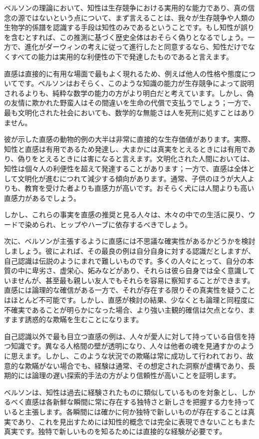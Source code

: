 \documentclass[a4paper,11pt,openany]{ltjsbook}
\begin{document}
ベルソンの理論において、知性は生存競争における実用的な能力であり、真の信念の源ではないという点について、まず言えることは、我々が生存競争や人類の生物学的係譜を認識する手段は知性のみであるということです。もし知性が誤りを含むとすれば、この推測に基づく歴史全体はおそらく偽りとなるでしょう。一方で、進化がダーウィンの考えに従って進行したと同意するなら、知性だけでなくすべての能力は実用的な利便性の下で発達したものであると言えます。

直感は直接的に有用な場面で最もよく現れるため、例えば他人の性格や態度についてです。ベルソンはおそらく、このような知識の能力が生存競争によって説明されるよりも、純粋な数学の能力の方がより明白だと考えています。しかし、偽の友情に欺かれた野蛮人はその間違いを生命の代償で支払うでしょう；一方で、最も文明化された社会においても、数学的な無能さは人を死刑に処すことはありません。

彼が示した直感の動物的例の大半は非常に直接的な生存価値があります。実際、知性と直感は有用であるため発達し、大まかには真実をとえるときには有用であり、偽りをとえるときには害になると言えます。文明化された人間においては、知性は個々人の利便性を超えて発達することがあります；一方で、直感は全体として文明化が進むにつれて減少する傾向があります。通常、子供のほうが大人よりも、教育を受けた者よりも直感力が高いです。おそらく犬には人間よりも高い直感力があるでしょう。

しかし、これらの事実を直感の推奨と見る人々は、木々の中での生活に戻り、ウードで染められ、ヒップやハーブに依存するべきでしょう。

次に、ベルソンが主張するように直感には不思議な確実性があるかどうかを検討しましょう。彼によれば、その最良の例は自分自身に対する認識だとしますが、自己認識は伝説のようにまれで難しいものです。多くの人々にとって、自分の本質の中に卑劣さ、虚栄心、妬みなどがあり、それらは彼ら自身では全く意識していませんが、甚至最も親しい友人でもそれらを容易に察知することができます。直感には論理的な確信がある一方で、それが存在する限りその真実性を疑うことはほとんど不可能です。しかし、直感が検討の結果、少なくとも論理と同程度に不確実であることが明らかになった場合、より強い主観的確信は欠点となり、ますます誘惑的な欺瞞を生むことになります。

自己認識以外で最も目立つ直感の例は、人々が愛人に対して持っている自信を持つ知識です。異なる人格間の壁が透明になり、人々は他者の魂を見通すかのように思えます。しかし、このような状況での欺瞞は常に成功して行われており、故意的な欺瞞がない場合でも、経験は通常、その想定された洞察が虚構であり、長期的には論理の遅い探索的手法の方がより信頼性が高いことを証明します。

ベルソンは、知性は過去に経験されたものに類似しているものを対象とし、しかるべく直感は各新鮮な瞬間に常に存在する独特さと新しさを把握する力を持っていると主張します。各瞬間には確かに何か独特で新しいものが存在することは真実であり、これを見出すためには知性的概念では完全に表現できないこともまた真実です。独特で新しいものを知るためには直接的な経験が必要です。
\end{document}
